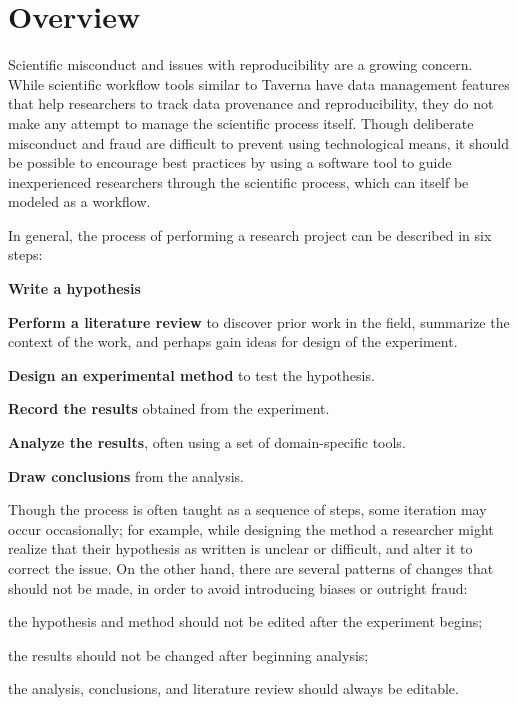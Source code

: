 \documentclass[document.tex]{subfiles}
\begin{document}
\section {Overview}
\label{sec:case-study-research-overview}

Scientific misconduct and issues with reproducibility are a growing concern.
While scientific workflow tools similar to Taverna have data management features that help researchers to track data provenance and reproducibility, they do not make any attempt to manage the scientific process itself. Though deliberate misconduct and fraud are difficult to prevent using technological means, it should be possible to encourage best practices by using a software tool to guide inexperienced researchers through the scientific process, which can itself be modeled as a workflow.

In general, the process of performing a research project can be described in six steps:
\begin{compactenum}
\item \textbf{Write a hypothesis}
\item \textbf{Perform a literature review} to discover prior work in the field, summarize the context of the work, and perhaps gain ideas for design of the experiment.
\item \textbf{Design an experimental method} to test the hypothesis.
\item \textbf{Record the results} obtained from the experiment.
\item \textbf{Analyze the results}, often using a set of domain-specific tools.
\item \textbf{Draw conclusions} from the analysis.
\end{compactenum}

Though the process is often taught as a sequence of steps, some iteration may occur occasionally; for example, while designing the method a researcher might realize that their hypothesis as written is unclear or difficult, and alter it to correct the issue. On the other hand, there are several patterns of changes that should not be made, in order to avoid introducing biases or outright fraud:
\begin{compactitem}
\item the hypothesis and method should not be edited after the experiment begins;
\item the results should not be changed after beginning analysis;
\item the analysis, conclusions, and literature review should always be editable.
\end{compactitem}
\end{document}
